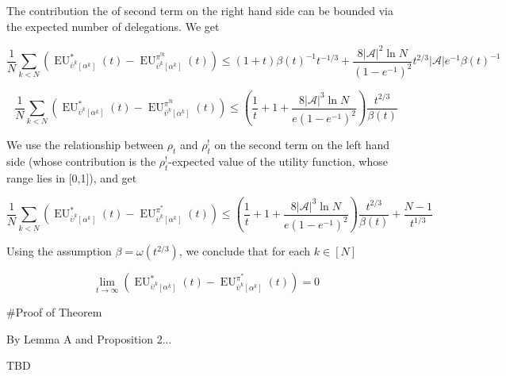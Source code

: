 \documentclass[a4paper]{article}
\newcommand{\Abs}[1]{\lvert #1 \rvert}
\newcommand{\A}{\mathcal{A}}
\newcommand{\EU}{\operatorname{EU}}
\begin{document}
The contribution the of second term on the right hand side can be bounded via the expected number of delegations. We get

$$\frac{1}{N}\sum_{k < N}(\EU_{\bar{\upsilon}^k[\alpha^k]}^{*}(t) - \EU_{\bar{\upsilon}^k[\alpha^k]}^{\pi^{!k}}(t)) \leq (1+t)\beta(t)^{-1}t^{-1/3}+\frac{8 \Abs{\A}^2 \ln{N}}{(1-e^{-1})^2}t^{2/3}\Abs{\A}e^{-1}\beta(t)^{-1}$$

$$\frac{1}{N}\sum_{k < N}(\EU_{\bar{\upsilon}^k[\alpha^k]}^{*}(t) - \EU_{\bar{\upsilon}^k[\alpha^k]}^{\pi^{!k}}(t)) \leq (\frac{1}{t}+1+\frac{8 \Abs{\A}^3 \ln{N}}{e(1-e^{-1})^2})\frac{t^{2/3}}{\beta(t)}$$

We use the relationship between $\rho_t$ and $\rho^!_t$ on the second term on the left hand side (whose contribution is the $\rho^!_t$-expected value of the utility function, whose range lies in [0,1]), and get

$$\frac{1}{N}\sum_{k < N}(\EU_{\bar{\upsilon}^k[\alpha^k]}^{*}(t) - \EU_{\bar{\upsilon}^k[\alpha^k]}^{\pi^{*}}(t)) \leq (\frac{1}{t}+1+\frac{8 \Abs{\A}^3 \ln{N}}{e(1-e^{-1})^2})\frac{t^{2/3}}{\beta(t)}+\frac{N-1}{t^{1/3}}$$

Using the assumption $\beta=\omega(t^{2/3})$, we conclude that for each $k \in [N]$

$$\lim_{t \rightarrow \infty} (\EU_{\bar{\upsilon}^k[\alpha^k]}^{*}(t) - \EU_{\bar{\upsilon}^k[\alpha^k]}^{\pi^*}(t)) = 0$$

\#Proof of Theorem

By Lemma A and Proposition 2...

TBD
\end{document}
